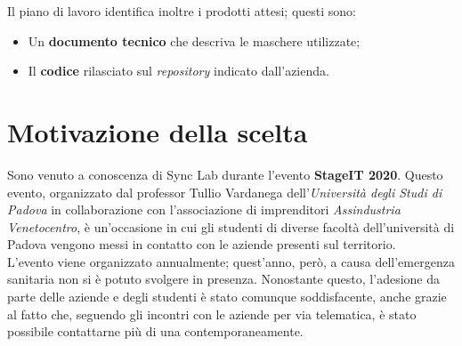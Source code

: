Il piano di lavoro identifica inoltre i prodotti attesi; questi sono:
\begin{itemize}
  \item Un \textbf{documento tecnico} che descriva le maschere utilizzate;
  \item Il \textbf{codice} rilasciato sul \textit{repository} indicato dall'azienda.
\end{itemize}


\section{Motivazione della scelta}

Sono venuto a conoscenza di Sync Lab durante l'evento \textbf{StageIT 2020}. Questo evento, organizzato dal professor Tullio Vardanega dell'\textit{Università degli Studi di Padova} in collaborazione con l'associazione di imprenditori \textit{Assindustria Venetocentro}, è un'occasione in cui gli studenti di diverse facoltà dell'università di Padova vengono messi in contatto con le aziende presenti sul territorio. \\
L'evento viene organizzato annualmente; quest'anno, però, a causa dell'emergenza sanitaria non si è potuto svolgere in presenza. Nonostante questo, l'adesione da parte delle aziende e degli studenti è stato comunque soddisfacente, anche grazie al fatto che, seguendo gli incontri con le aziende per via telematica, è stato possibile contattarne più di una contemporaneamente. \\


